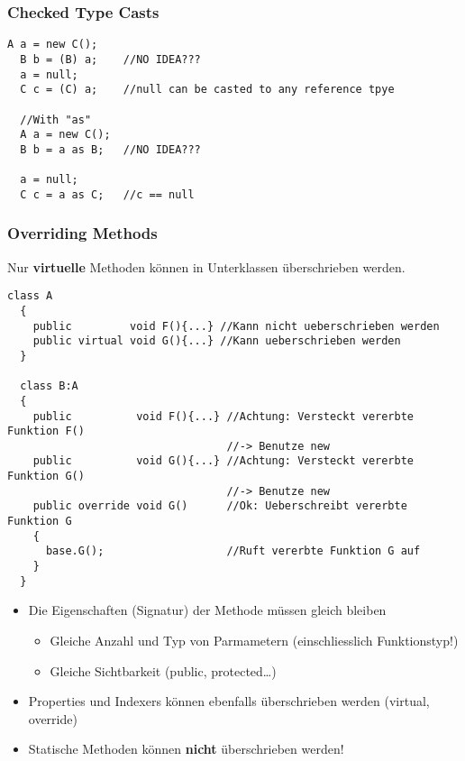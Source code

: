 \subsubsection{Checked Type Casts}
\begin{lstlisting}[style=Csharp]
  A a = new C(); 
  B b = (B) a;    //NO IDEA???
  a = null; 
  C c = (C) a;    //null can be casted to any reference tpye
  
  //With "as"
  A a = new C();  
  B b = a as B;   //NO IDEA???
  
  a = null; 
  C c = a as C;   //c == null
\end{lstlisting}

\subsubsection{Overriding Methods}
Nur \textbf{virtuelle} Methoden können in Unterklassen überschrieben werden. 
\begin{lstlisting}[style=Csharp]
  class A
  {
    public         void F(){...} //Kann nicht ueberschrieben werden 
    public virtual void G(){...} //Kann ueberschrieben werden
  }
  
  class B:A
  {
    public          void F(){...} //Achtung: Versteckt vererbte Funktion F()
                                  //-> Benutze new
    public          void G(){...} //Achtung: Versteckt vererbte Funktion G()
                                  //-> Benutze new
    public override void G()      //Ok: Ueberschreibt vererbte Funktion G
    {
      base.G();                   //Ruft vererbte Funktion G auf
    }
  }
\end{lstlisting}
\begin{itemize}
  \item Die Eigenschaften (Signatur) der Methode müssen gleich bleiben 
  \begin {itemize}
    \item Gleiche Anzahl und Typ von Parmametern (einschliesslich Funktionstyp!)
    \item Gleiche Sichtbarkeit (public, protected\ldots)
  \end{itemize}
  \item Properties und Indexers können ebenfalls überschrieben werden (virtual,
  override)
  \item Statische Methoden können \textbf{nicht} überschrieben werden!
\end{itemize}

